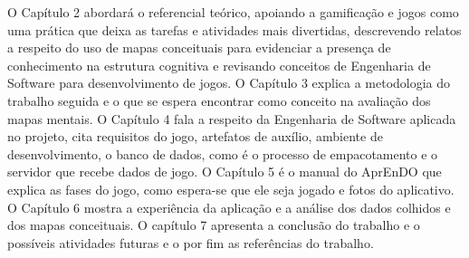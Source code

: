 O Capítulo 2 abordará o referencial teórico, apoiando a gamificação e jogos como uma prática que deixa as tarefas e atividades mais divertidas, descrevendo relatos a respeito do uso de mapas conceituais para evidenciar a presença de conhecimento na estrutura cognitiva e revisando conceitos de Engenharia de Software para desenvolvimento de jogos.
O Capítulo 3 explica a metodologia do trabalho seguida e o que se espera encontrar como conceito na avaliação dos mapas mentais. O Capítulo 4 fala a respeito da Engenharia de Software aplicada no projeto, cita requisitos do jogo, artefatos de auxílio, ambiente de desenvolvimento, o banco de dados, como é o processo de empacotamento e o servidor que recebe dados de jogo. O Capítulo 5 é o manual do AprEnDO que explica as fases do jogo, como espera-se que ele seja jogado e fotos do aplicativo. O Capítulo 6 mostra a experiência da aplicação e a análise dos dados colhidos e dos mapas conceituais. O capítulo 7 apresenta a conclusão do trabalho e o possíveis atividades futuras e o por fim as referências do trabalho.
